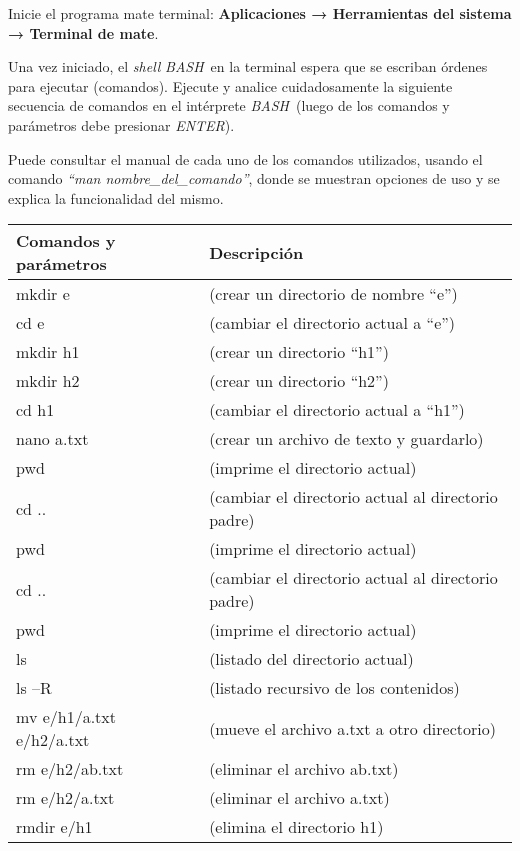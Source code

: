 \documentclass[12pt]{article}
\newcommand{\bash}{\emph{BASH}\ }
\begin{document}
Inicie el programa mate terminal: \textbf{Aplicaciones → Herramientas del sistema →
Terminal de mate}.

Una vez iniciado, el \emph{shell} \bash en la terminal espera que se escriban
órdenes para ejecutar (comandos). Ejecute y analice cuidadosamente la
siguiente secuencia de comandos en el intérprete \bash (luego de los comandos
y parámetros debe presionar \emph{ENTER}).

Puede consultar el manual de cada uno de los comandos utilizados, usando el
comando \emph{``man nombre\_del\_comando''}, donde se muestran opciones de uso y
se explica la funcionalidad del mismo.

\begin{center}
    \begin{tabular}[t]{|l|l|}
    \hline
        \textbf{Comandos y parámetros} & \textbf{Descripción} \\
    \hline
    \hline
        mkdir e & (crear un directorio de nombre “e”) \\
    \hline
        cd e & (cambiar el directorio actual a “e”) \\
    \hline
        mkdir h1 & (crear un directorio “h1”) \\
    \hline
        mkdir h2 & (crear un directorio “h2”) \\
    \hline
        cd h1 & (cambiar el directorio actual a “h1”) \\
    \hline
        nano a.txt & (crear un archivo de texto y guardarlo) \\
    \hline
        pwd & (imprime el directorio actual) \\
    \hline
        cd .. & (cambiar el directorio actual al directorio padre) \\
    \hline
        pwd & (imprime el directorio actual) \\
    \hline
        cd .. & (cambiar el directorio actual al directorio padre) \\
    \hline
        pwd & (imprime el directorio actual) \\
    \hline
        ls & (listado del directorio actual) \\
    \hline
        ls –R & (listado recursivo de los contenidos) \\
    \hline
        mv e/h1/a.txt e/h2/a.txt & (mueve el archivo a.txt a otro directorio) \\
    \hline
        rm e/h2/ab.txt & (eliminar el archivo ab.txt) \\
    \hline
        rm e/h2/a.txt & (eliminar el archivo a.txt) \\
    \hline
        rmdir e/h1 & (elimina el directorio h1)\\
    \hline
    \end{tabular}

\end{center}
\end{document}
